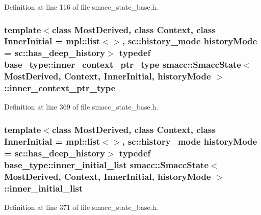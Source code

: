 Definition at line 116 of file smacc\+\_\+state\+\_\+base.\+h.

\subsubsection[{\texorpdfstring{inner\+\_\+context\+\_\+ptr\+\_\+type}{inner_context_ptr_type}}]{\setlength{\rightskip}{0pt plus 5cm}template$<$class Most\+Derived, class Context, class Inner\+Initial = mpl\+::list$<$$>$, sc\+::history\+\_\+mode history\+Mode = sc\+::has\+\_\+deep\+\_\+history$>$ typedef base\+\_\+type\+::inner\+\_\+context\+\_\+ptr\+\_\+type {\bf smacc\+::\+Smacc\+State}$<$ Most\+Derived, Context, Inner\+Initial, history\+Mode $>$\+::{\bf inner\+\_\+context\+\_\+ptr\+\_\+type}}\hypertarget{classsmacc_1_1SmaccState_a65a772c2e2039e9a59148ba6ffb54d8a}{}\label{classsmacc_1_1SmaccState_a65a772c2e2039e9a59148ba6ffb54d8a}


Definition at line 369 of file smacc\+\_\+state\+\_\+base.\+h.

\subsubsection[{\texorpdfstring{inner\+\_\+initial\+\_\+list}{inner_initial_list}}]{\setlength{\rightskip}{0pt plus 5cm}template$<$class Most\+Derived, class Context, class Inner\+Initial = mpl\+::list$<$$>$, sc\+::history\+\_\+mode history\+Mode = sc\+::has\+\_\+deep\+\_\+history$>$ typedef base\+\_\+type\+::inner\+\_\+initial\+\_\+list {\bf smacc\+::\+Smacc\+State}$<$ Most\+Derived, Context, Inner\+Initial, history\+Mode $>$\+::{\bf inner\+\_\+initial\+\_\+list}}\hypertarget{classsmacc_1_1SmaccState_acb4ac84bce421d39b594510a6b2df558}{}\label{classsmacc_1_1SmaccState_acb4ac84bce421d39b594510a6b2df558}


Definition at line 371 of file smacc\+\_\+state\+\_\+base.\+h.

